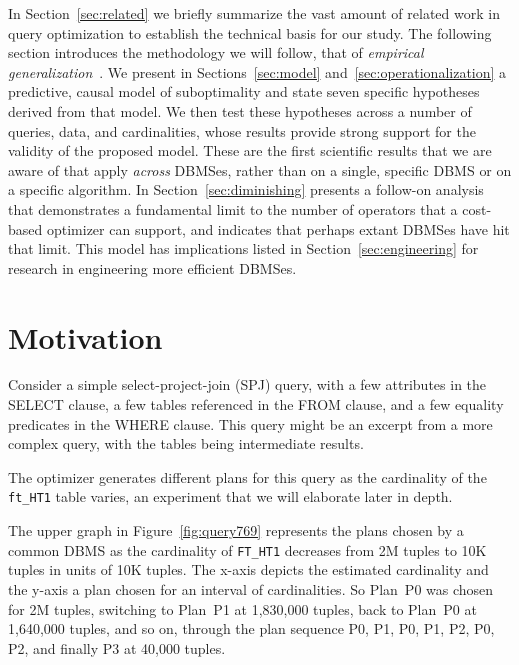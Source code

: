 \documentclass[prodmode,acmtods]{acmsmall}
\begin{document}
In Section~\ref{sec:related} we briefly summarize the vast amount of related
work in query optimization to establish the technical basis for our study.
The following section introduces the methodology we will follow, that of
{\em empirical generalization}~\cite{cohenbook}. We present in
Sections~\ref{sec:model} and~\ref{sec:operationalization} a predictive,
causal model of suboptimality and state seven specific hypotheses derived
from that model. We then test these hypotheses across a number of queries,
data, and cardinalities, whose results provide strong support for the
validity of the proposed model.  These are the first scientific results that
we are aware of that apply {\em across} \hbox{DBMSes}, rather than on a
single, specific \hbox{DBMS} or on a specific algorithm. In
Section~\ref{sec:diminishing} presents a follow-on analysis that
demonstrates a fundamental limit to the number of operators that a
cost-based optimizer can support, and indicates that perhaps extant DBMSes
have hit that limit. This model has implications listed in
Section~\ref{sec:engineering} for research in engineering more efficient
\hbox{DBMSes}.

\section{Motivation}\label{sec:motivation}

Consider a simple select-project-join (SPJ) query, with a few attributes in
the SELECT clause, a few tables referenced in the FROM clause,
and a few equality predicates in the WHERE clause. This query might be an
excerpt from a more complex query, with the tables being intermediate
results.

\noindent
\hspace{3ex}{\small\begin{verbatim}
        SELECT t0.id1, t0.id2, t2.id4, t1.id1 
        FROM ft_HT3 t2, ft_HT2 t1, ft_HT1 t0 
        WHERE (t2.id4=t1.id1 AND t2.id1=t0.id1)
\end{verbatim}
}

\noindent
The optimizer generates
different plans for this query as the cardinality of the {\tt
  ft\_HT1} table varies, an experiment that we will elaborate later in depth.

The upper graph in Figure~\ref{fig:query769} represents the plans chosen by
a common DBMS as the cardinality of {\tt FT\_HT1} decreases from 2M tuples
to 10K tuples in units of 10K tuples. The \hbox{x-axis} depicts the estimated
cardinality and the y-axis  a plan chosen for an interval of
cardinalities. So Plan~P0 was chosen for 2M tuples, switching to Plan~P1 at
1,830,000 tuples, back to Plan~P0 at 1,640,000 tuples, and so on, through
the plan
sequence P0, P1, P0, P1, P2, P0, P2, and finally P3 at 40,000 tuples.
\end{document}
